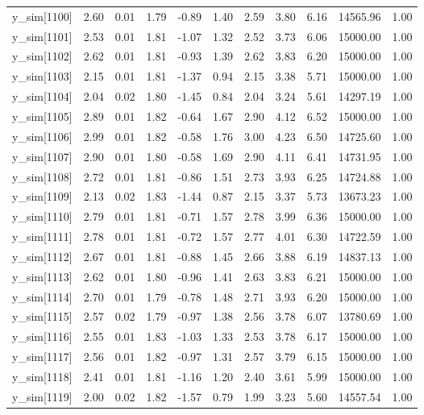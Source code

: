 \begin{table}[ht]
\begin{tabular}{rrrrrrrrrrr}
  y\_sim[1100] & 2.60 & 0.01 & 1.79 & -0.89 & 1.40 & 2.59 & 3.80 & 6.16 & 14565.96 & 1.00 \\ 
  y\_sim[1101] & 2.53 & 0.01 & 1.81 & -1.07 & 1.32 & 2.52 & 3.73 & 6.06 & 15000.00 & 1.00 \\ 
  y\_sim[1102] & 2.62 & 0.01 & 1.81 & -0.93 & 1.39 & 2.62 & 3.83 & 6.20 & 15000.00 & 1.00 \\ 
  y\_sim[1103] & 2.15 & 0.01 & 1.81 & -1.37 & 0.94 & 2.15 & 3.38 & 5.71 & 15000.00 & 1.00 \\ 
  y\_sim[1104] & 2.04 & 0.02 & 1.80 & -1.45 & 0.84 & 2.04 & 3.24 & 5.61 & 14297.19 & 1.00 \\ 
  y\_sim[1105] & 2.89 & 0.01 & 1.82 & -0.64 & 1.67 & 2.90 & 4.12 & 6.52 & 15000.00 & 1.00 \\ 
  y\_sim[1106] & 2.99 & 0.01 & 1.82 & -0.58 & 1.76 & 3.00 & 4.23 & 6.50 & 14725.60 & 1.00 \\ 
  y\_sim[1107] & 2.90 & 0.01 & 1.80 & -0.58 & 1.69 & 2.90 & 4.11 & 6.41 & 14731.95 & 1.00 \\ 
  y\_sim[1108] & 2.72 & 0.01 & 1.81 & -0.86 & 1.51 & 2.73 & 3.93 & 6.25 & 14724.88 & 1.00 \\ 
  y\_sim[1109] & 2.13 & 0.02 & 1.83 & -1.44 & 0.87 & 2.15 & 3.37 & 5.73 & 13673.23 & 1.00 \\ 
  y\_sim[1110] & 2.79 & 0.01 & 1.81 & -0.71 & 1.57 & 2.78 & 3.99 & 6.36 & 15000.00 & 1.00 \\ 
  y\_sim[1111] & 2.78 & 0.01 & 1.81 & -0.72 & 1.57 & 2.77 & 4.01 & 6.30 & 14722.59 & 1.00 \\ 
  y\_sim[1112] & 2.67 & 0.01 & 1.81 & -0.88 & 1.45 & 2.66 & 3.88 & 6.19 & 14837.13 & 1.00 \\ 
  y\_sim[1113] & 2.62 & 0.01 & 1.80 & -0.96 & 1.41 & 2.63 & 3.83 & 6.21 & 15000.00 & 1.00 \\ 
  y\_sim[1114] & 2.70 & 0.01 & 1.79 & -0.78 & 1.48 & 2.71 & 3.93 & 6.20 & 15000.00 & 1.00 \\ 
  y\_sim[1115] & 2.57 & 0.02 & 1.79 & -0.97 & 1.38 & 2.56 & 3.78 & 6.07 & 13780.69 & 1.00 \\ 
  y\_sim[1116] & 2.55 & 0.01 & 1.83 & -1.03 & 1.33 & 2.53 & 3.78 & 6.17 & 15000.00 & 1.00 \\ 
  y\_sim[1117] & 2.56 & 0.01 & 1.82 & -0.97 & 1.31 & 2.57 & 3.79 & 6.15 & 15000.00 & 1.00 \\ 
  y\_sim[1118] & 2.41 & 0.01 & 1.81 & -1.16 & 1.20 & 2.40 & 3.61 & 5.99 & 15000.00 & 1.00 \\ 
  y\_sim[1119] & 2.00 & 0.02 & 1.82 & -1.57 & 0.79 & 1.99 & 3.23 & 5.60 & 14557.54 & 1.00 \\ 

\end{tabular}
\end{table}
